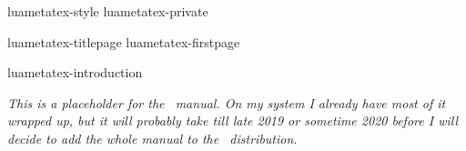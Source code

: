 
\environment luametatex-style
\environment luametatex-private

\startdocument
  [manual=LuaMeta\TeX,
   status=experimental,
   version=2.00]

\component luametatex-titlepage
\component luametatex-firstpage

\startfrontmatter
    \component luametatex-introduction
\stopfrontmatter

\startbodymatter

    \startparagraph \em
        This is a placeholder for the \LUAMETATEX\ manual. On my system I already
        have most of it wrapped up, but it will probably take till late 2019 or
        sometime 2020 before I will decide to add the whole manual to the
        \CONTEXT\ distribution.
    \stopparagraph


\stopbodymatter

\startbackmatter
\stopbackmatter

\stopdocument
